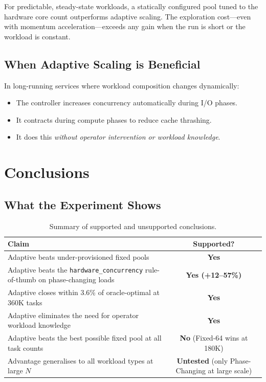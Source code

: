 \documentclass[12pt,a4paper]{article}
\begin{document}
For predictable, steady-state workloads, a statically configured pool
tuned to the hardware core count outperforms adaptive scaling.
The exploration cost---even with momentum acceleration---exceeds any gain
when the run is short or the workload is constant.

\subsection{When Adaptive Scaling is Beneficial}

In long-running services where workload composition changes dynamically:
\begin{itemize}
  \item The controller increases concurrency automatically during I/O phases.
  \item It contracts during compute phases to reduce cache thrashing.
  \item It does this \emph{without operator intervention or workload
        knowledge}.
\end{itemize}

\section{Conclusions}

\subsection{What the Experiment Shows}

\begin{table}[H]
\centering
\caption{Summary of supported and unsupported conclusions.}
\begin{tabular}{p{9cm}c}
\toprule
\textbf{Claim} & \textbf{Supported?} \\
\midrule
Adaptive beats under-provisioned fixed pools
  & \textcolor{wingreen}{\textbf{Yes}} \\
Adaptive beats the \texttt{hardware\_concurrency} rule-of-thumb on
phase-changing loads
  & \textcolor{wingreen}{\textbf{Yes (+12--57\%)}} \\
Adaptive closes within 3.6\% of oracle-optimal at 360K tasks
  & \textcolor{wingreen}{\textbf{Yes}} \\
Adaptive eliminates the need for operator workload knowledge
  & \textcolor{wingreen}{\textbf{Yes}} \\
Adaptive beats the best possible fixed pool at all task counts
  & \textcolor{lossred}{\textbf{No}} (Fixed-64 wins at 180K) \\
Advantage generalises to all workload types at large $N$
  & \textcolor{lossred}{\textbf{Untested}} (only Phase-Changing at
    large scale) \\
\bottomrule
\end{tabular}
\label{tab:conclusions}
\end{table}
\end{document}
